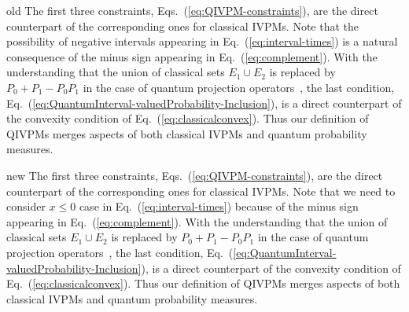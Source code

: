 \documentclass[english,reprint, aps, prl,superscriptaddress, showpacs,
showkeys, longbibliography, amsmath, amssymb, floatfix]{revtex4-1}
\theoremstyle{plain}
\theoremstyle{definition}
\newcommand{\says}[3]{\begin{framed}\begin{minipage}{0.9\linewidth}\color{#1}{#2 says: #3}\end{minipage}\end{framed}}
\newcommand{\yutsung}[1]{\says{purple}{Yu-Tsung}{#1}}
\newcommand{\andy}[1]{\says{blue}{Andy}{#1}}
\newenvironment{compare}{\begin{widetext}\end{widetext}}{\begin{widetext}\end{widetext}}
\newenvironment{oldText}[1]{\begin{compareText}{#1}{old}}{\end{compareText}\newpage}
\newenvironment{newText}[1]{\begin{compareText}{#1}{new}}{\end{compareText}}
\begin{document}
\begin{compare}
\begin{oldText}{\andy}
\noindent The first three constraints,
Eqs.~(\ref{eq:QIVPM-constraints}), are the direct counterpart of the
corresponding ones for classical IVPMs.  {\color{blue}Note that the possibility of negative
intervals appearing in Eq.~(\ref{eq:interval-times})
is a natural consequence of the minus sign appearing in
Eq.~(\ref{eq:complement}).}  With the understanding that
the union of classical sets $E_1\cup E_2$ is replaced by
$P_0+P_1-P_0P_1$ in the case of quantum projection
operators~\cite{Griffiths2003}, the last condition,
Eq.~(\ref{eq:QuantumInterval-valuedProbability-Inclusion}), is a
direct counterpart of the convexity condition of
Eq.~(\ref{eq:classicalconvex}). Thus our definition of QIVPMs merges
aspects of both classical IVPMs and quantum probability measures.
\end{oldText}
\begin{newText}{\yutsung}
\noindent The first three constraints,
Eqs.~(\ref{eq:QIVPM-constraints}), are the direct counterpart of the
corresponding ones for classical IVPMs.  {\color{purple}Note that we need to
consider $x\le0$ case in Eq.~(\ref{eq:interval-times}) because of the minus sign
appearing in
Eq.~(\ref{eq:complement}).}  With the understanding that
the union of classical sets $E_1\cup E_2$ is replaced by
$P_0+P_1-P_0P_1$ in the case of quantum projection
operators~\cite{Griffiths2003}, the last condition,
Eq.~(\ref{eq:QuantumInterval-valuedProbability-Inclusion}), is a
direct counterpart of the convexity condition of
Eq.~(\ref{eq:classicalconvex}). Thus our definition of QIVPMs merges
aspects of both classical IVPMs and quantum probability measures.
\end{newText}
\end{compare}
\end{document}
